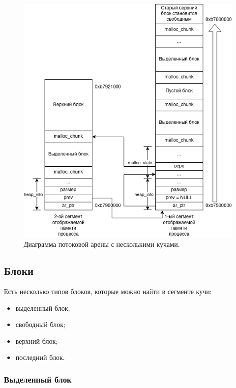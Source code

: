 \begin{figure}[!h]
	\begin{center}
		\includegraphics[scale=0.6]{images/glibc-malloc-thread-arena-multi.png}
		\caption{Диаграмма потоковой арены с несколькими кучами.}
		\label{glibc-malloc-thread-arena-multi}
	\end{center}
\end{figure}

\subsection{Блоки}
Есть несколько типов блоков, которые можно найти в сегменте кучи:
\begin{itemize}
	\item выделенный блок;
	\item свободный блок;
	\item верхний блок;
	\item последний блок.
\end{itemize}

\subsubsection{Выделенный блок}

